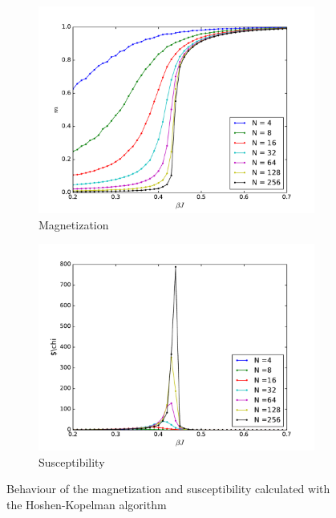 \documentclass[twoside]{article}
\begin{document}
\begin{multicols}{2}
\begin{figure}[b]
  \begin{subfigure}[b]{0.35\textwidth}
    \includegraphics[width=\textwidth]{images/magnetization.pdf}
    \caption{Magnetization}
    \label{magnetization}
  \end{subfigure}
  \begin{subfigure}[b]{0.35\textwidth}
    \includegraphics[width=\textwidth]{images/susceptibility.pdf}
    \caption{Susceptibility}
    \label{susceptibility}
  \end{subfigure}
  \caption{Behaviour of the magnetization and susceptibility calculated with the Hoshen-Kopelman algorithm}
\end{figure}


\end{multicols}
\end{document}
